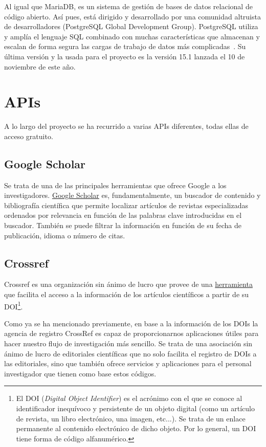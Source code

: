 Al igual que MariaDB, es un sistema de gestión de bases de datos relacional de código abierto. Así pues, está dirigido y desarrollado por una comunidad altruista de desarrolladores (PostgreSQL Global Development Group).
PostgreSQL utiliza y amplía el lenguaje SQL combinado con muchas características que almacenan y escalan de forma segura las cargas de trabajo de datos más complicadas~\cite{Postgresql.org}. 
Su última versión y la usada para el proyecto es la versión 15.1 lanzada el 10 de noviembre de este año.


\section{APIs}
A lo largo del proyecto se ha recurrido a varias APIs diferentes, todas ellas de acceso gratuito.

\subsection{Google Scholar}
Se trata de una de las principales herramientas que ofrece Google a los investigadores. \href{https://scholar.google.com/}{Google Scholar} es, fundamentalmente, un buscador de contenido y bibliografía científica que permite localizar artículos de revistas especializadas ordenados por relevancia en función de las palabras clave introducidas en el buscador. También se puede  filtrar la información en función de su fecha de publicación, idioma o número de citas.


\subsection{Crossref}

 Crossref es una organización sin ánimo de lucro que provee de una \href{https://www.crossref.org/}{herramienta} que facilita el acceso a la información de los artículos científicos a partir de su DOI\footnote{El DOI (\textit{Digital Object Identifier}) es el acrónimo con el que se conoce al identificador inequívoco y persistente de un objeto digital (como un artículo de revista, un libro electrónico, una imagen, etc...). Se trata de un enlace permanente al contenido electrónico de dicho objeto. Por lo general, un DOI tiene forma de código alfanumérico.}.

Como ya se ha mencionado previamente, en base a la información de los DOIs la agencia de registro CrossRef es capaz de proporcionarnos aplicaciones útiles para hacer nuestro flujo de investigación más sencillo.
Se trata de una asociación sin ánimo de lucro de editoriales científicas que no solo facilita el registro de DOIs a las editoriales, sino que también ofrece servicios y aplicaciones para el personal investigador que tienen como base estos códigos.


